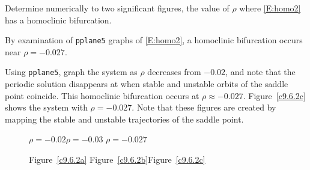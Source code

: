 \documentclass{ximera}
\begin{document}
\begin{computerExercise} \label{c9.6.2c}
Determine numerically to two significant figures, the value of $\rho$
where \eqref{E:homo2} has a homoclinic bifurcation. 

\begin{solution}

\ans By examination of {\tt pplane5} graphs of \eqref{E:homo2}, a homoclinic
bifurcation occurs near $\rho = -0.027$.

\soln 
Using {\tt pplane5}, graph the system as $\rho$ decreases from $-0.02$, and
note that the periodic solution disappears at when stable and unstable
orbits of the saddle point coincide.  This homoclinic bifurcation occurs
at $\rho \approx -0.027$.  Figure~\ref{c9.6.2c} shows the system with
$\rho = -0.027$.  Note that these figures are created by mapping the stable
and unstable trajectories of the saddle point.

\begin{figure}[htb]
                       \centerline{%
                       }
		\centerline{$\rho = -0.02$\hspace{1.1in}$\rho = -0.03$
\hspace{1.1in}$\rho = -0.027$}
		\centerline{Figure~\ref{c9.6.2a}\hspace{1.2in}
Figure~\ref{c9.6.2b}\hspace{1.2in}Figure~\ref{c9.6.2c}}
\end{figure}

\end{solution}
\end{computerExercise} 
\end{document}
